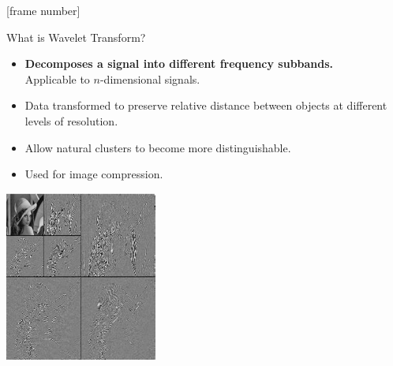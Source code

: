 \documentclass[aspectratio=169,t]{beamer}
\begin{document}
  {
    [frame number]
    \begin{frame}{What is Wavelet Transform?}
    \begin{minipage}[b]{0.55\textwidth}
      \begin{itemize}
        \item \textbf{Decomposes a signal into different frequency subbands.}\\
              Applicable to $n$-dimensional signals.
        \item Data transformed to preserve relative distance between objects at different levels of resolution.
        \item Allow natural clusters to become more distinguishable.
        \item Used for image compression.
      \end{itemize}
    \end{minipage}\hspace{1cm}
    \begin{minipage}[b]{0.30\textwidth}
      \includegraphics[width=5cm]{img/wavelettransform.png}
    \end{minipage}
    \end{frame}
  }
\end{document}
